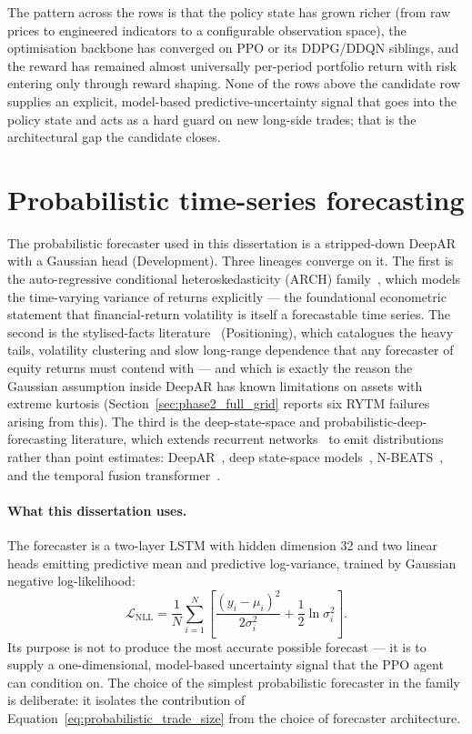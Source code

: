 The pattern across the rows is that the policy state has grown richer (from raw prices to engineered indicators to a configurable observation space), the optimisation backbone has converged on PPO or its DDPG/DDQN siblings, and the reward has remained almost universally per-period portfolio return with risk entering only through reward shaping. None of the rows above the candidate row supplies an explicit, model-based predictive-uncertainty signal that goes into the policy state and acts as a hard guard on new long-side trades; that is the architectural gap the candidate closes.

\section{Probabilistic time-series forecasting}
\label{sec:probabilistic_forecasting}

The probabilistic forecaster used in this dissertation is a stripped-down DeepAR~\parencite{salinas2020deepar} with a Gaussian head (Development). Three lineages converge on it. The first is the auto-regressive conditional heteroskedasticity (ARCH) family~\parencite{engle1982arch,bollerslev1986garch}, which models the time-varying variance of returns explicitly --- the foundational econometric statement that financial-return volatility is itself a forecastable time series. The second is the stylised-facts literature~\parencite{cont2001empirical} (Positioning), which catalogues the heavy tails, volatility clustering and slow long-range dependence that any forecaster of equity returns must contend with --- and which is exactly the reason the Gaussian assumption inside DeepAR has known limitations on assets with extreme kurtosis (Section~\ref{sec:phase2_full_grid} reports six RYTM failures arising from this). The third is the deep-state-space and probabilistic-deep-forecasting literature, which extends recurrent networks~\parencite{hochreiter1997lstm} to emit distributions rather than point estimates: DeepAR~\parencite{salinas2020deepar}, deep state-space models~\parencite{rangapuram2018deep}, N-BEATS~\parencite{oreshkin2020nbeats}, and the temporal fusion transformer~\parencite{lim2021temporal}.

\paragraph{What this dissertation uses.} The forecaster is a two-layer LSTM with hidden dimension 32 and two linear heads emitting predictive mean and predictive log-variance, trained by Gaussian negative log-likelihood:
\begin{equation}
  \label{eq:gaussian_nll}
  \mathcal{L}_{\mathrm{NLL}} = \frac{1}{N} \sum_{i=1}^{N} \left[ \frac{(y_i - \mu_i)^2}{2 \sigma_i^2} + \frac{1}{2} \ln \sigma_i^2 \right].
\end{equation}
Its purpose is not to produce the most accurate possible forecast --- it is to supply a one-dimensional, model-based uncertainty signal that the PPO agent can condition on. The choice of the simplest probabilistic forecaster in the family is deliberate: it isolates the contribution of Equation~\ref{eq:probabilistic_trade_size} from the choice of forecaster architecture.


